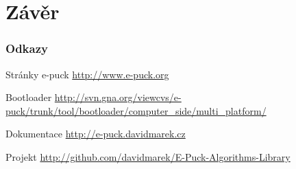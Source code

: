 \documentclass{beamer}
\begin{document}
\section{Závěr}
\begin{frame}
    \frametitle{Odkazy}
    \begin{block}{Stránky e-puck}
    \small
    \url{http://www.e-puck.org}
    \end{block}
    \begin{block}{Bootloader}
    \small
    \url{http://svn.gna.org/viewcvs/e-puck/trunk/tool/bootloader/computer_side/multi_platform/}
    \end{block}
    \begin{block}{Dokumentace}
    \small
    \url{http://e-puck.davidmarek.cz}
    \end{block}
    \begin{block}{Projekt}
    \small
    \url{http://github.com/davidmarek/E-Puck-Algorithms-Library}
    \end{block}
\end{frame}
\end{document}
